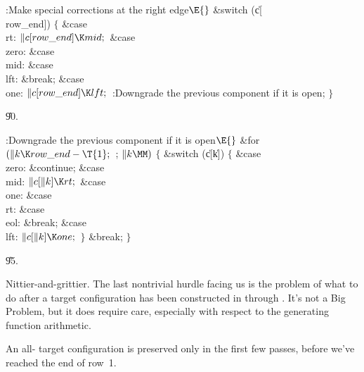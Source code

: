 \B{}:Make special corrections at the right edge\X${}\E{}$\6
\&{switch} (\|c[\\{row\_end}])\5
${}\{{}$\1\6
\4\&{case} \\{rt}:\5
${}\|c[\\{row\_end}]\K\\{mid};{}$\6
\4\&{case} \\{zero}:\5
\&{case} \\{mid}:\5
\&{case} \\{lft}:\5
\&{break};\6
\4\&{case} \\{one}:\5
${}\|c[\\{row\_end}]\K\\{lft};{}$\6
:Downgrade the previous component if it is open\X;\6
\4${}\}{}$\2\par
\U90.\fi

\B{}:Downgrade the previous component if it is open\X${}\E{}$\6
\&{for} ${}(\|k\K\\{row\_end}-\T{1};{}$  ; ${}\|k\MM){}$\5
${}\{{}$\1\6
\&{switch} (\|c[\|k])\5
${}\{{}$\1\6
\4\&{case} \\{zero}:\5
\&{continue};\6
\4\&{case} \\{mid}:\5
${}\|c[\|k]\K\\{rt};{}$\6
\4\&{case} \\{one}:\5
\&{case} \\{rt}:\5
\&{case} \\{eol}:\5
\&{break};\6
\4\&{case} \\{lft}:\5
${}\|c[\|k]\K\\{one};{}$\6
\4${}\}{}$\2\6
\&{break};\6
\4${}\}{}$\2\par
\U95.\fi

Nittier-and-grittier. The last nontrivial hurdle facing us
is the problem of what to do after a target configuration has
been constructed in  through . It's not a Big
Problem,
but it does require care, especially with respect to the
generating function arithmetic.

An all- target configuration is preserved only in the
first few passes, before we've reached the end of row~1.

